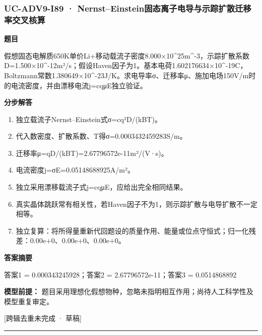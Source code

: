 \documentclass[UTF8,11pt,a4paper]{ctexart}
\begin{document}
\subsubsection*{UC-ADV9-I89 · Nernst–Einstein固态离子电导与示踪扩散迁移率交叉核算}
\noindent\textbf{题目}\par
假想固态电解质650K单价Li+移动载流子密度8.000×10\textasciicircum{}25m\textasciicircum{}-3，示踪扩散系数D=1.500×10\textasciicircum{}-12m²/s；假设Haven因子为1。基本电荷1.602176634×10\textasciicircum{}-19C，Boltzmann常数1.380649×10\textasciicircum{}-23J/K。求电导率σ、迁移率μ、施加电场150V/m时的电流密度，并由漂移电流j=cqμE独立验证。\par
\medskip\noindent\textbf{分步解答}
\begin{enumerate}
\item 独立载流子Nernst–Einstein式σ=cq²D/(kBT)。
\item 代入数密度、扩散系数、T得σ=0.0003432459283S/m。
\item 迁移率μ=qD/(kBT)=2.67796572e-11m²/(V·s)。
\item 电流密度j=σE=0.05148688925A/m²。
\item 独立采用漂移载流子式j=cqμE，应给出完全相同结果。
\item 真实晶体跳跃常有相关性，若Haven因子不为1，则示踪扩散与电导扩散不一定相等。
\item 独立复算：将所得量重新代回题设的质量作用、能量或位点守恒式；归一化残差：0.00e+0、0.00e+0、0.00e+0。
\end{enumerate}
\noindent\textbf{答案摘要}\par
答案1 = 0.000343245928；答案2 = 2.67796572e-11；答案3 = 0.0514868892\par
\noindent\textbf{模型前提：}
题目采用理想化假想物种，忽略未指明相互作用；尚待人工科学性及模型重复审定。\par
\noindent\textcolor{red!65!black}{[跨辑去重未完成 · 草稿]} \par
\medskip\hrule\medskip
{}
\end{document}
